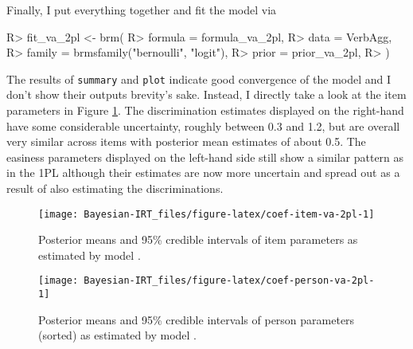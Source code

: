 \documentclass[jss]{jss}
\begin{document}
Finally, I put everything together and fit the model via

\begin{CodeChunk}

\begin{CodeInput}
R> fit_va_2pl <- brm(
R>   formula = formula_va_2pl,
R>   data = VerbAgg, 
R>   family = brmsfamily("bernoulli", "logit"),
R>   prior = prior_va_2pl,
R> )
\end{CodeInput}
\end{CodeChunk}

The results of \texttt{summary} and \texttt{plot} indicate good
convergence of the model and I don't show their outputs brevity's sake.
Instead, I directly take a look at the item parameters in Figure
\ref{fig:coef-item-va-2pl}. The discrimination estimates displayed on
the right-hand have some considerable uncertainty, roughly between 0.3
and 1.2, but are overall very similar across items with posterior mean
estimates of about 0.5. The easiness parameters displayed on the
left-hand side still show a similar pattern as in the 1PL although their
estimates are now more uncertain and spread out as a result of also
estimating the discriminations.

\begin{CodeChunk}
\begin{figure}

{\centering \texttt{[image: Bayesian-IRT\_files/figure-latex/coef-item-va-2pl-1]} 

}

\caption[Posterior means and 95\% credible intervals of item parameters as estimated by model ]{Posterior means and 95\% credible intervals of item parameters as estimated by model .}\label{fig:coef-item-va-2pl}
\end{figure}
\end{CodeChunk}

\begin{CodeChunk}
\begin{figure}

{\centering \texttt{[image: Bayesian-IRT\_files/figure-latex/coef-person-va-2pl-1]} 

}

\caption[Posterior means and 95\% credible intervals of person parameters (sorted) as estimated by model ]{Posterior means and 95\% credible intervals of person parameters (sorted) as estimated by model .}\label{fig:coef-person-va-2pl}
\end{figure}
\end{CodeChunk}
\end{document}
